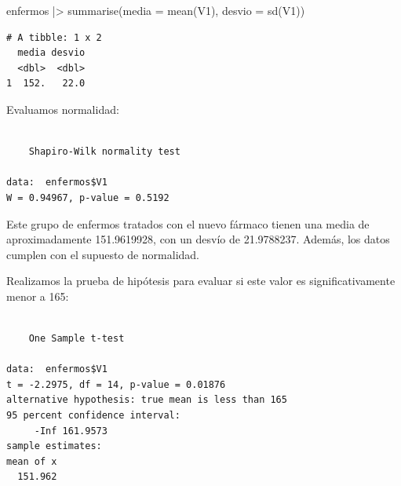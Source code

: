 \documentclass[
  spanish,
  a4paper,
]{scrbook}
\newenvironment{Shaded}{\begin{snugshade}}{\end{snugshade}}
\newcommand{\AttributeTok}[1]{\textcolor[rgb]{0.40,0.45,0.13}{#1}}
\newcommand{\DecValTok}[1]{\textcolor[rgb]{0.68,0.00,0.00}{#1}}
\newcommand{\FloatTok}[1]{\textcolor[rgb]{0.68,0.00,0.00}{#1}}
\newcommand{\FunctionTok}[1]{\textcolor[rgb]{0.28,0.35,0.67}{#1}}
\newcommand{\NormalTok}[1]{\textcolor[rgb]{0.00,0.23,0.31}{#1}}
\newcommand{\SpecialCharTok}[1]{\textcolor[rgb]{0.37,0.37,0.37}{#1}}
\newcommand{\StringTok}[1]{\textcolor[rgb]{0.13,0.47,0.30}{#1}}
\begin{document}
\begin{Shaded}
\begin{Highlighting}[]
\NormalTok{enfermos }\SpecialCharTok{|\textgreater{}}
  \FunctionTok{summarise}\NormalTok{(}\AttributeTok{media =} \FunctionTok{mean}\NormalTok{(V1), }\AttributeTok{desvio =} \FunctionTok{sd}\NormalTok{(V1))}
\end{Highlighting}
\end{Shaded}

\begin{verbatim}
# A tibble: 1 x 2
  media desvio
  <dbl>  <dbl>
1  152.   22.0
\end{verbatim}

Evaluamos normalidad:

\begin{Shaded}
\end{Shaded}

\begin{verbatim}

    Shapiro-Wilk normality test

data:  enfermos$V1
W = 0.94967, p-value = 0.5192
\end{verbatim}

Este grupo de enfermos tratados con el nuevo fármaco tienen una media de
aproximadamente 151.9619928, con un desvío de 21.9788237. Además, los
datos cumplen con el supuesto de normalidad.

Realizamos la prueba de hipótesis para evaluar si este valor es
significativamente menor a 165:

\begin{Shaded}
\end{Shaded}

\begin{verbatim}

    One Sample t-test

data:  enfermos$V1
t = -2.2975, df = 14, p-value = 0.01876
alternative hypothesis: true mean is less than 165
95 percent confidence interval:
     -Inf 161.9573
sample estimates:
mean of x 
  151.962 
\end{verbatim}
\end{document}
